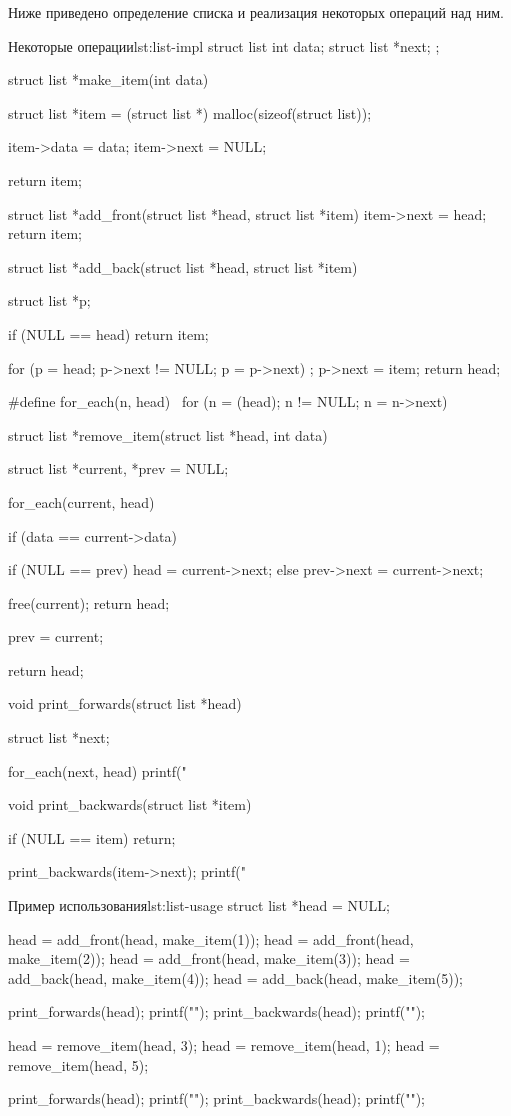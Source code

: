 Ниже приведено определение списка и реализация некоторых операций над ним.

\begin{clst}{Некоторые операции}{lst:list-impl}
struct list {
    int data;
    struct list *next;
};

struct list *make_item(int data)
{
    struct list *item = (struct list *) malloc(sizeof(struct list));

    item->data = data;
    item->next = NULL;

    return item;
}

struct list *add_front(struct list *head, struct list *item)
{
    item->next = head;
    return item;
}

struct list *add_back(struct list *head, struct list *item) {
    struct list *p;

    if (NULL == head)
        return item;

    for (p = head; p->next != NULL; p = p->next)
        ;
    p->next = item;
    return head;
}

#define for_each(n, head)                       \
    for (n = (head); n != NULL; n = n->next)    \

struct list *remove_item(struct list *head, int data)
{
    struct list *current, *prev = NULL;

    for_each(current, head) {
        if (data == current->data) {
            if (NULL == prev)
                head = current->next;
            else
                prev->next = current->next;

            free(current);
            return head;
        }

        prev = current;
    }

    return head;
}

void print_forwards(struct list *head)
{
    struct list *next;

    for_each(next, head)
        printf("%
}

void print_backwards(struct list *item)
{
    if (NULL == item)
        return;

    print_backwards(item->next);
    printf("%
}
\end{clst}

\begin{clst}{Пример использования}{lst:list-usage}
struct list *head = NULL;

head = add_front(head, make_item(1));
head = add_front(head, make_item(2));
head = add_front(head, make_item(3));
head = add_back(head, make_item(4));
head = add_back(head, make_item(5));

print_forwards(head);
printf("\n");
print_backwards(head);
printf("\n");

head = remove_item(head, 3);
head = remove_item(head, 1);
head = remove_item(head, 5);

print_forwards(head);
printf("\n");
print_backwards(head);
printf("\n");
\end{clst}

